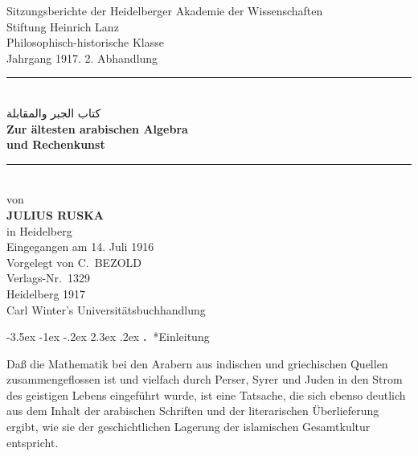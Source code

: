 \documentclass[11pt,a4paper]{article}
\makeatletter
\newcommand{\RL}[1]{\beginR#1\endR}
\renewcommand{\section}{\@startsection{section}{1}{\z@}%
  {-3.5ex \@plus -1ex \@minus -.2ex}%
  {2.3ex \@plus .2ex}%
  {\normalfont\Large\bfseries\color{sectioncolor}\thesection.\ }}
\newcommand{\ar}[1]{{\arabicfont\RL{#1}}}
\makeatother
\begin{document}
\thispagestyle{empty}
\begin{center}
\vspace*{1cm}
{\small Sitzungsberichte der Heidelberger Akademie der Wissenschaften\\
Stiftung Heinrich Lanz\\
Philosophisch-historische Klasse\\[0.5em]
Jahrgang 1917. 2. Abhandlung}\\[2cm]

\rule{\textwidth}{1pt}\\[0.8cm]
{\ar{كتاب الجبر والمقابلة} \\[0.3em]
\textcolor{titlecolor}{\Huge\bfseries Zur \"altesten arabischen Algebra\\[0.5em] und Rechenkunst}}\\[0.8cm]
\rule{\textwidth}{1pt}\\[2cm]

{\Large von}\\[0.5cm]
{\LARGE\bfseries JULIUS RUSKA}\\[0.3cm]
{\large in Heidelberg}\\[2cm]

{\small Eingegangen am 14. Juli 1916}\\
{\small Vorgelegt von C.\ BEZOLD}\\[1cm]

{\small Verlags-Nr.\ 1329}\\[1cm]

{\large Heidelberg 1917}\\
{\normalsize Carl Winter's Universit\"atsbuchhandlung}
\end{center}
\clearpage

\tableofcontents
\clearpage

\section*{Einleitung}

Da\ss{} die Mathematik bei den Arabern aus indischen und griechischen Quellen zusammengeflossen ist und vielfach durch Perser, Syrer und Juden in den Strom des geistigen Lebens eingef\"uhrt wurde, ist eine Tatsache, die sich ebenso deutlich aus dem Inhalt der arabischen Schriften und der literarischen \"Uberlieferung ergibt, wie sie der geschichtlichen Lagerung der islamischen Gesamtkultur entspricht.
\end{document}
